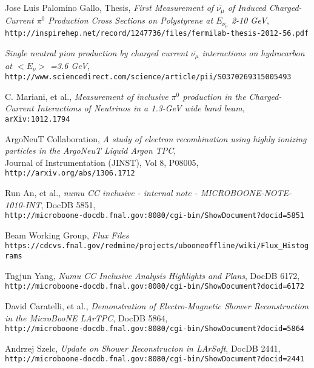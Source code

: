 \documentclass[a4paper]{article}
\begin{document}
\begin{thebibliography}{9}
  Jose Luis Palomino Gallo, Thesis, \emph{First Measurement of $\overline{\nu_\mu}$ of Induced Charged-Current $\pi^0$ Production Cross Sections on Polystyrene at $E_{\overline{\nu_\mu}}$ 2-10 GeV},\\
  \texttt{http://inspirehep.net/record/1247736/files/fermilab-thesis-2012-56.pdf}  
  
   \emph{Single neutral pion production by charged current $\overline{\nu_\mu}$ interactions on hydrocarbon at $< E_\nu >$ =3.6 GeV},\\
  \texttt{http://www.sciencedirect.com/science/article/pii/S0370269315005493}  
  
  C. Mariani, et al., \emph{Measurement of inclusive $\pi^0$ production in the Charged-Current Interactions of Neutrinos in a 1.3-GeV wide band beam},\\
  \texttt{arXiv:1012.1794}

  ArgoNeuT Collaboration, \emph{A study of electron recombination using highly ionizing particles in the ArgoNeuT Liquid Argon TPC},\\
  Journal of Instrumentation (JINST), Vol 8, P08005, \texttt{http://arxiv.org/abs/1306.1712}

  Run An, et al., \emph{numu CC inclusive - internal note - MICROBOONE-NOTE-1010-INT}, DocDB 5851,\\
  \texttt{http://microboone-docdb.fnal.gov:8080/cgi-bin/ShowDocument?docid=5851}
  
  Beam Working Group, \emph{Flux Files}\\
  \texttt{https://cdcvs.fnal.gov/redmine/projects/ubooneoffline/wiki/Flux\_Histograms}

  Tngjun Yang, \emph{Numu CC Inclusive Analysis Highlights and Plans}, DocDB 6172,\\
  \texttt{http://microboone-docdb.fnal.gov:8080/cgi-bin/ShowDocument?docid=6172}

  David Caratelli, et al., \emph{Demonstration of Electro-Magnetic Shower Reconstruction in the MicroBooNE LArTPC}, DocDB 5864,\\
  \texttt{http://microboone-docdb.fnal.gov:8080/cgi-bin/ShowDocument?docid=5864}



  Andrzej Szelc, \emph{Update on Shower Reconstructon in LArSoft}, DocDB 2441,\\
  \texttt{http://microboone-docdb.fnal.gov:8080/cgi-bin/ShowDocument?docid=2441}


\end{thebibliography}
\end{document}
